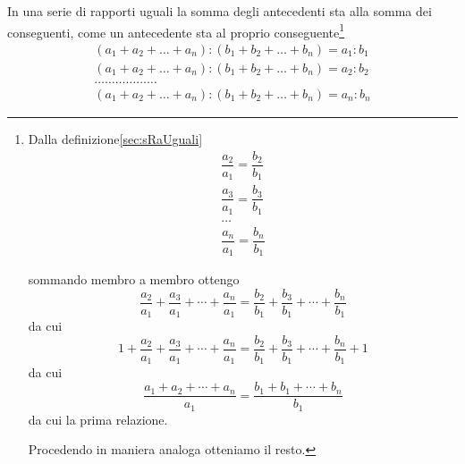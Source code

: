In una serie di rapporti uguali la somma degli antecedenti sta alla somma dei conseguenti, come un antecedente sta al proprio conseguente\footnote{Dalla definizione\nobs\vref{sec:sRaUguali}
	\begin{gather*}
	\dfrac{a_{2}}{a_{1}}=\dfrac{b_{2}}{b_{1}}\\
	\dfrac{a_{3}}{a_{1}}=\dfrac{b_{3}}{b_{1}}
	\\
	\ldots%
	\\
	\dfrac{a_{n}}{a_{1}}=\dfrac{b_{n}}{b_{1}}
	\end{gather*}
	
	sommando membro a membro ottengo
	\[\dfrac{a_{2}}{a_{1}}+\dfrac{a_{3}}{a_{1}}+\cdots+\dfrac{a_{n}}{a_{1}}=\dfrac{b_{2}}{b_{1}}+\dfrac{b_{3}}{b_{1}}+\cdots+\dfrac{b_{n}}{b_{1}}\]
	da cui
	\[1+\dfrac{a_{2}}{a_{1}}+\dfrac{a_{3}}{a_{1}}+\cdots+\dfrac{a_{n}}{a_{1}}=\dfrac{b_{2}}{b_{1}}+\dfrac{b_{3}}{b_{1}}+\cdots+\dfrac{b_{n}}{b_{1}}+1\]
	da cui 
	\[\dfrac{a_{1}+a_{2}+\cdots+a_{n}}{a_{1}}=\dfrac{b_{1}+b_{1}+\cdots+b_{n}}{b_{1}}\]
	da cui la prima relazione.
	
	Procedendo in maniera analoga otteniamo il resto.}
\begin{gather*}
	(a_{1}+a_{2}+\ldots+a_{n}): (b_{1}+b_{2}+\ldots+b_{n})=a_{1}:b_{1}
	\\(a_{1}+a_{2}+\ldots+a_{n}): (b_{1}+b_{2}+\ldots+b_{n})=a_{2}:b_{2}
	\\\ldots\ldots\ldots\ldots\ldots\ldots%
	\\(a_{1}+a_{2}+\ldots+a_{n}): (b_{1}+b_{2}+\ldots+b_{n})=a_{n}:b_{n}
\end{gather*}